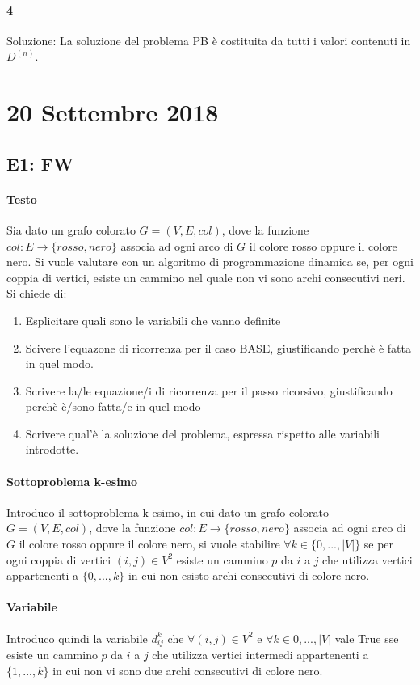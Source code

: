 \documentclass[12pt, a4paper, openany]{book}
\begin{document}
\paragraph*{4}Soluzione:
La soluzione del problema PB è costituita da tutti i valori contenuti in $D^{(n)}$.

\section{20 Settembre 2018}
\subsection{E1: FW}
\paragraph{Testo}
Sia dato un grafo colorato $G=(V,E,col)$, dove la funzione $col:E\to \{rosso,nero\}$ associa ad ogni arco di $G$ il colore rosso oppure il colore nero.
Si vuole valutare con un algoritmo di programmazione dinamica se, per ogni coppia di vertici, esiste un cammino nel quale non vi sono archi consecutivi neri. Si chiede di:
\begin{enumerate}
	\item Esplicitare quali sono le variabili che vanno definite
	\item Scivere l'equazone di ricorrenza per il caso BASE, giustificando perchè è fatta in quel modo.
	\item Scrivere la/le equazione/i di ricorrenza per il passo ricorsivo, giustificando perchè è/sono fatta/e in quel modo
	\item Scrivere qual'è la soluzione del problema, espressa rispetto alle variabili introdotte.
\end{enumerate}
\paragraph*{Sottoproblema k-esimo}
Introduco il sottoproblema k-esimo, in cui dato un grafo colorato $G=(V,E,col)$, dove la funzione $col:E\to \{rosso,nero\}$ associa ad ogni arco di $G$ il colore rosso oppure il colore nero,
si vuole stabilire  $\forall k\in \{0,...,|V|\}$ se per ogni coppia di vertici $(i,j) \in V^2$ esiste un cammino $p$ da $i$ a $j$ che utilizza vertici appartenenti a $\{0,...,k\}$ in cui non esisto archi consecutivi di colore nero.

\paragraph*{Variabile}
Introduco quindi la variabile $d_{ij}^k$ che $\forall (i,j) \in V^2$ e $\forall k\in {0,...,|V|}$ vale True sse esiste un cammino $p$ da $i$ a $j$ che utilizza vertici intermedi appartenenti a $\{1,...,k\}$ in cui non vi sono due archi consecutivi di colore nero.
\end{document}

